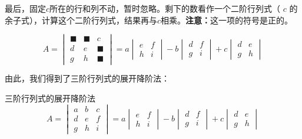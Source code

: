 最后，固定$c$所在的行和列不动，暂时忽略。剩下的数看作一个二阶行列式（ $c$ 的余子式），计算这个二阶行列式，结果再与$c$相乘。\textbf{注意：}这一项的符号是正的。

\[
A = \begin{vmatrix}
    \blacksquare & \blacksquare & c \\
    d & e & \blacksquare \\
    g & h & \blacksquare
  \end{vmatrix}
  = a \begin{vmatrix}
    e & f \\
    h & i
  \end{vmatrix}
  - b \begin{vmatrix}
    d & f \\
    g & i
    \end{vmatrix}
  + c \begin{vmatrix}
    d & e \\
    g & h
  \end{vmatrix}
\]

由此，我们得到了三阶行列式的展开降阶法：
\begin{theorem}{三阶行列式的展开降阶法}{}
  $$A =  \begin{vmatrix}
    a & b & c \\
    d & e & f \\
    g & h & i
  \end{vmatrix} =
  a \begin{vmatrix}
    e & f \\
    h & i
  \end{vmatrix} - b \begin{vmatrix}
    d & f \\
    g & i
  \end{vmatrix} + c \begin{vmatrix}
    d & e \\
    g & h
  \end{vmatrix}$$
\end{theorem}

